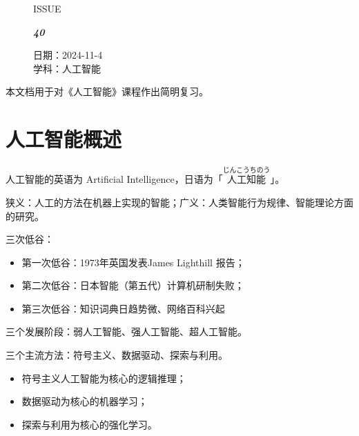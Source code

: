\documentclass[UTF8]{ctexart}
\newcommand\Black[1]{\textcolor[gray]{0.3}{#1}}
\newcommand\Brown[1]{\textcolor[HTML]{998A4E}{#1}}
\newcommand\IssueNumber{40}
\newcommand\Date{2024-11-4}
\newcommand\Subject{人工智能}
\begin{document}
\begin{figure}[H]
\hspace{1cm}
\begin{minipage}[t]{0.3\textwidth}
\centering
    \Brown{\Genshin ISSUE}

    \vspace{-0.6cm}
    \Huge \Issue\slshape\bfseries\Black{\IssueNumber}
\end{minipage}
\hfill
\begin{minipage}[t]{0.35\textwidth}
\small
\centering
    \Brown{日期：\Date} \\
\vspace{-0.1cm}
    \Brown{学科：\Subject} \\
\end{minipage}
\hspace{0.8cm}
\end{figure}

{\color{cyan!50!black}
本文档用于对《人工智能》课程作出简明复习。}

\section{人工智能概述}
人工智能的英语为 Artificial Intelligence，日语为「$\stackrel{\text{じんこうちのう}}{\text{人工知能}}$」。

狭义：人工的方法在机器上实现的智能；广义：人类智能行为规律、智能理论方面的研究。

三次低谷：
\begin{itemize}[itemsep=0pt,parsep=0pt]
  \item 第一次低谷：1973年英国发表James Lighthill 报告；
  \item 第二次低谷：日本智能（第五代）计算机研制失败；
  \item 第三次低谷：知识词典日趋势微、网络百科兴起
\end{itemize}

三个发展阶段：弱人工智能、强人工智能、超人工智能。

三个主流方法：符号主义、数据驱动、探索与利用。
\begin{itemize}[itemsep=0pt,parsep=0pt]
  \item 符号主义人工智能为核心的逻辑推理；
  \item 数据驱动为核心的机器学习；
  \item 探索与利用为核心的强化学习。
\end{itemize}
\end{document}

